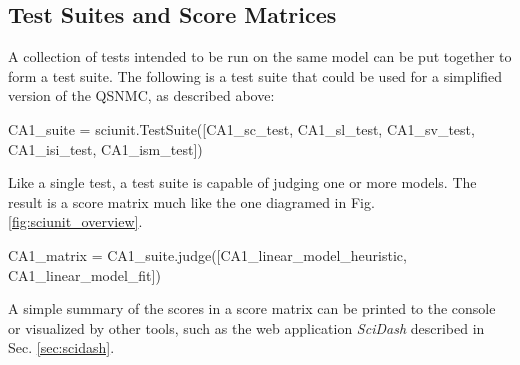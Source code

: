 \documentclass[9pt]{sig-alternate}
\begin{document}
\subsection{Test Suites and Score Matrices} A collection of tests intended to be run on the same model can be put together to form a test suite.
The following is a test suite that could be used for a simplified version of the QSNMC, as described above:  
\begin{python}
CA1_suite = sciunit.TestSuite([CA1_sc_test, CA1_sl_test, CA1_sv_test, CA1_isi_test, CA1_ism_test])
\end{python}
Like a single test, a test suite is capable of judging one or more models. The result is a score matrix much like the one diagramed in Fig. \ref{fig:sciunit_overview}.
\begin{python}
CA1_matrix = CA1_suite.judge([CA1_linear_model_heuristic, CA1_linear_model_fit])
\end{python}
A simple summary of the scores in a score matrix can be printed to the console or  visualized by other tools, such as the web application \textit{SciDash} described in Sec. \ref{sec:scidash}.







%
%
%


%
%
%




\end{document}
